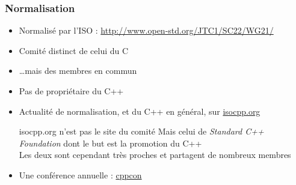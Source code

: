 \documentclass[C++.tex]{subfiles}
\begin{document}
\begin{frame}
	\frametitle{Normalisation}
	\begin{itemize}
		\item Normalisé par l'ISO : \url{http://www.open-std.org/JTC1/SC22/WG21/}


		\item Comité distinct de celui du C


		\item \ldots mais des membres en commun
		\item Pas de propriétaire du C++


		\item Actualité de normalisation, et du C++ en général, sur \href{https://isocpp.org/}{isocpp.org}


	\begin{alertblock}{isocpp.org n'est pas le site du comité}
		Mais celui de \textit{Standard C++ Foundation} dont le but est la promotion du C++\\
		Les deux sont cependant très proches et partagent de nombreux membres
		
	\end{alertblock}

		\item Une conférence annuelle : \href{http://cppcon.org/}{cppcon}
	\end{itemize}
\end{frame}
\end{document}
